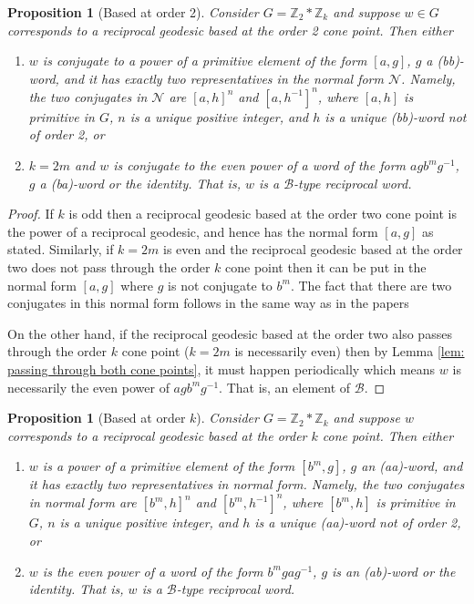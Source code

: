 \documentclass[11pt]{amsart}
\numberwithin{equation}{section}
\theoremstyle{plain}
\newtheorem{prop}[thm]{Proposition}
\begin{document}
 
\begin{prop}[Based at order 2]  \label{prop: normal form based at order 2}
Consider $G=\mathbb{Z}_2\ast\mathbb{Z}_k$ and suppose $w \in G$ corresponds to  a reciprocal geodesic based at the order 2 cone point.  Then either 
\begin{enumerate}
\item   $w$  is conjugate to a power of a primitive element of the form $[a,g]$, $g$ a (bb)-word,  and it 
     has exactly two  representatives  in the normal form $\mathcal{N}$. Namely, the two conjugates in $\mathcal{N}$ are $[a,h]^n$ and $[a,h^{-1}]^n$,  where $[a, h]$ is primitive in $G$, $n$ is a unique positive integer, and $h$ is a unique (bb)-word not of order 2, or 
      \item $k=2m$ and $w$  is conjugate to the even power of a word of the form $agb^{m}g^{-1}$,  $g$ a (ba)-word or the identity.  That is, $w$ is a $\mathcal{B}$-type reciprocal word. 
 \end{enumerate}
 \end{prop}
  
 
  \begin{proof}  If $k$ is odd then a  reciprocal geodesic based at the order two cone point  is the power of a reciprocal geodesic,  and hence has the normal form $[a,g]$ as stated. Similarly, 
  if $k=2m$ is even and the reciprocal geodesic based at the order two does not pass through the order $k$ cone point then it can be put in the normal form $[a,g]$ where $g$ is not conjugate to $b^{m}$.  The fact that there are two conjugates in  this normal form follows in the same way as in the papers \cite{BasSuz, ErSo2, Sar}
  
  On the other hand,  if the reciprocal geodesic based at the order two also passes through the order $k$ cone point ($k=2m$ is necessarily even)  then  by Lemma \ref{lem: passing through both cone points}, it must happen periodically which means $w$ is necessarily the even power of $a gb^{m}g^{-1}$.    That is, an element of $\mathcal{B}$. 
 \end{proof}
 

     
     \begin{prop}[Based at order $k$] \label{prop: normal form based at order k}
Consider $G=\mathbb{Z}_2\ast\mathbb{Z}_k$ and suppose $w$ corresponds to  a reciprocal geodesic based at the order $k$  cone point.  Then either 
\begin{enumerate}
 \item $w$  is a power of a primitive element of the form $[b^{m}, g]$, $g$ an (aa)-word, and it
     has exactly two  representatives  in normal form. Namely, the two conjugates in normal form  are $[b^{m},h]^n$ and $[b^{m},h^{-1}]^n$,  where $[b^{m}, h]$ is primitive in $G$, $n$ is a unique positive integer, and $h$ is a unique (aa)-word not of order 2, or
     \item   $w$  is the even power of a word of the form $b^{m}gag^{-1}$, $g$ is an (ab)-word or the identity. That is, $w$ is a $\mathcal{B}$-type reciprocal word. 
   \end{enumerate}
  \end{prop} 
  
\end{document}
